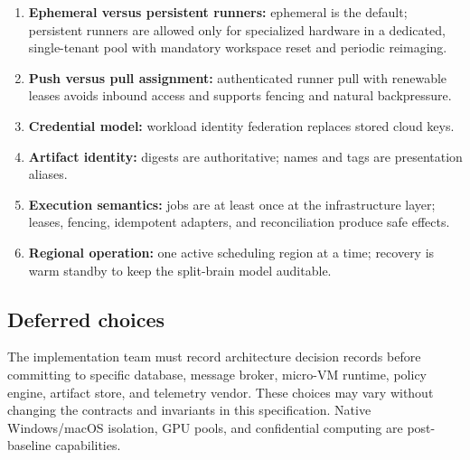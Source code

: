 \begin{enumerate}
  \item \textbf{Ephemeral versus persistent runners:} ephemeral is the default; persistent
        runners are allowed only for specialized hardware in a dedicated, single-tenant
        pool with mandatory workspace reset and periodic reimaging.
  \item \textbf{Push versus pull assignment:} authenticated runner pull with renewable
        leases avoids inbound access and supports fencing and natural backpressure.
  \item \textbf{Credential model:} workload identity federation replaces stored cloud keys.
  \item \textbf{Artifact identity:} digests are authoritative; names and tags are presentation aliases.
  \item \textbf{Execution semantics:} jobs are at least once at the infrastructure layer;
        leases, fencing, idempotent adapters, and reconciliation produce safe effects.
  \item \textbf{Regional operation:} one active scheduling region at a time; recovery is
        warm standby to keep the split-brain model auditable.
\end{enumerate}

\subsection{Deferred choices}

The implementation team must record architecture decision records before committing to
specific database, message broker, micro-VM runtime, policy engine, artifact store, and
telemetry vendor. These choices may vary without changing the contracts and invariants
in this specification. Native Windows/macOS isolation, GPU pools, and confidential
computing are post-baseline capabilities.

